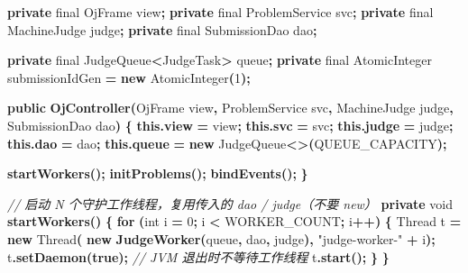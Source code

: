 \documentclass[
  11pt,
]{ctexart}
\newenvironment{Shaded}{\begin{snugshade}}{\end{snugshade}}
\newcommand{\BuiltInTok}[1]{#1}
\newcommand{\CommentTok}[1]{\textcolor[rgb]{0.56,0.35,0.01}{\textit{#1}}}
\newcommand{\ControlFlowTok}[1]{\textcolor[rgb]{0.13,0.29,0.53}{\textbf{#1}}}
\newcommand{\DataTypeTok}[1]{\textcolor[rgb]{0.13,0.29,0.53}{#1}}
\newcommand{\DecValTok}[1]{\textcolor[rgb]{0.00,0.00,0.81}{#1}}
\newcommand{\FunctionTok}[1]{\textcolor[rgb]{0.13,0.29,0.53}{\textbf{#1}}}
\newcommand{\KeywordTok}[1]{\textcolor[rgb]{0.13,0.29,0.53}{\textbf{#1}}}
\newcommand{\NormalTok}[1]{#1}
\newcommand{\OperatorTok}[1]{\textcolor[rgb]{0.81,0.36,0.00}{\textbf{#1}}}
\newcommand{\StringTok}[1]{\textcolor[rgb]{0.31,0.60,0.02}{#1}}
\begin{document}
\begin{Shaded}
\begin{Highlighting}[]
    \KeywordTok{private} \DataTypeTok{final}\NormalTok{ OjFrame view}\OperatorTok{;}
    \KeywordTok{private} \DataTypeTok{final}\NormalTok{ ProblemService svc}\OperatorTok{;}
    \KeywordTok{private} \DataTypeTok{final}\NormalTok{ MachineJudge judge}\OperatorTok{;}
    \KeywordTok{private} \DataTypeTok{final}\NormalTok{ SubmissionDao dao}\OperatorTok{;}

    \KeywordTok{private} \DataTypeTok{final}\NormalTok{ JudgeQueue}\OperatorTok{\textless{}}\NormalTok{JudgeTask}\OperatorTok{\textgreater{}}\NormalTok{ queue}\OperatorTok{;}
    \KeywordTok{private} \DataTypeTok{final} \BuiltInTok{AtomicInteger}\NormalTok{ submissionIdGen }\OperatorTok{=} \KeywordTok{new} \BuiltInTok{AtomicInteger}\OperatorTok{(}\DecValTok{1}\OperatorTok{);}

    \KeywordTok{public} \FunctionTok{OjController}\OperatorTok{(}\NormalTok{OjFrame view}\OperatorTok{,}
\NormalTok{                        ProblemService svc}\OperatorTok{,}
\NormalTok{                        MachineJudge judge}\OperatorTok{,}
\NormalTok{                        SubmissionDao dao}\OperatorTok{)} \OperatorTok{\{}
        \KeywordTok{this}\OperatorTok{.}\FunctionTok{view}  \OperatorTok{=}\NormalTok{ view}\OperatorTok{;}
        \KeywordTok{this}\OperatorTok{.}\FunctionTok{svc}   \OperatorTok{=}\NormalTok{ svc}\OperatorTok{;}
        \KeywordTok{this}\OperatorTok{.}\FunctionTok{judge} \OperatorTok{=}\NormalTok{ judge}\OperatorTok{;}
        \KeywordTok{this}\OperatorTok{.}\FunctionTok{dao}   \OperatorTok{=}\NormalTok{ dao}\OperatorTok{;}
        \KeywordTok{this}\OperatorTok{.}\FunctionTok{queue} \OperatorTok{=} \KeywordTok{new}\NormalTok{ JudgeQueue}\OperatorTok{\textless{}\textgreater{}(}\NormalTok{QUEUE\_CAPACITY}\OperatorTok{);}

        \FunctionTok{startWorkers}\OperatorTok{();}
        \FunctionTok{initProblems}\OperatorTok{();}
        \FunctionTok{bindEvents}\OperatorTok{();}
    \OperatorTok{\}}

    \CommentTok{// 启动 N 个守护工作线程，复用传入的 dao / judge（不要 new）}
    \KeywordTok{private} \DataTypeTok{void} \FunctionTok{startWorkers}\OperatorTok{()} \OperatorTok{\{}
        \ControlFlowTok{for} \OperatorTok{(}\DataTypeTok{int}\NormalTok{ i }\OperatorTok{=} \DecValTok{0}\OperatorTok{;}\NormalTok{ i }\OperatorTok{\textless{}}\NormalTok{ WORKER\_COUNT}\OperatorTok{;}\NormalTok{ i}\OperatorTok{++)} \OperatorTok{\{}
            \BuiltInTok{Thread}\NormalTok{ t }\OperatorTok{=} \KeywordTok{new} \BuiltInTok{Thread}\OperatorTok{(}
                \KeywordTok{new} \FunctionTok{JudgeWorker}\OperatorTok{(}\NormalTok{queue}\OperatorTok{,}\NormalTok{ dao}\OperatorTok{,}\NormalTok{ judge}\OperatorTok{),}
                \StringTok{"judge{-}worker{-}"} \OperatorTok{+}\NormalTok{ i}\OperatorTok{);}
\NormalTok{            t}\OperatorTok{.}\FunctionTok{setDaemon}\OperatorTok{(}\KeywordTok{true}\OperatorTok{);}   \CommentTok{// JVM 退出时不等待工作线程}
\NormalTok{            t}\OperatorTok{.}\FunctionTok{start}\OperatorTok{();}
        \OperatorTok{\}}
    \OperatorTok{\}}


\end{Highlighting}
\end{Shaded}
\end{document}
